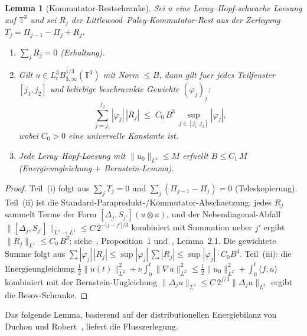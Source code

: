 \documentclass[12pt,a4paper]{article}
\theoremstyle{definition}
\theoremstyle{plain}
\newtheorem{lemma}[definition]{Lemma}
\theoremstyle{remark}
\begin{document}
\begin{lemma}[Kommutator-Restschranke]\label{lem:remainder}
Sei $u$ eine Leray--Hopf-schwache Loesung auf $\mathbb{T}^3$ und sei $R_j$
der Littlewood--Paley-Kommutator-Rest aus der Zerlegung
$T_j = \Pi_{j-1} - \Pi_j + R_j$.
\begin{enumerate}
  \item[\textup{(i)}] $\sum_j R_j = 0$ (Erhaltung).
  \item[\textup{(ii)}] Gilt $u \in L^3_t B^{1/3}_{3,\infty}(\mathbb{T}^3)$
    mit Norm $\le B$, dann gilt fuer jedes Teilfenster $[j_1, j_2]$ und
    beliebige beschraenkte Gewichte $(\varphi_j)_j$:
    \begin{equation}\label{eq:Rj-bound}
      \sum_{j=j_1}^{j_2} |\varphi_j|\,|R_j|
      \;\le\;
      C_0\,B^3\,\sup_{j \in [j_1,j_2]} |\varphi_j|,
    \end{equation}
    wobei $C_0 > 0$ eine universelle Konstante ist.
  \item[\textup{(iii)}] Jede Leray--Hopf-Loesung mit
    $\|u_0\|_{L^2} \le M$ erfuellt $B \le C_1\,M$ (Energieungleichung
    $+$ Bernstein-Lemma).
\end{enumerate}
\end{lemma}

\begin{proof}
Teil~(i) folgt aus $\sum_j T_j = 0$ und $\sum_j(\Pi_{j-1}-\Pi_j)=0$
(Teleskopierung). Teil~(ii) ist die Standard-Paraprodukt-/Kommutator-Abschaetzung:
jedes $R_j$ sammelt Terme der Form $[\Delta_j, S_{j'}](u \otimes u)$,
und der Nebendiagonal-Abfall $\|[\Delta_j, S_{j'}]\|_{L^1 \to L^1}
\le C\,2^{-|j-j'|/3}$ kombiniert mit Summation ueber $j'$ ergibt
$\|R_j\|_{L^1} \le C_0\,B^3$; siehe~\cite{CET94}, Proposition~1
und~\cite{DR00}, Lemma~2.1. Die gewichtete Summe folgt aus
$\sum |{\varphi_j}|\,|{R_j}| \le \sup|\varphi_j|\,\sum|R_j|
\le \sup|\varphi_j|\cdot C_0 B^3$.
Teil~(iii): die Energieungleichung $\frac{1}{2}\|u(t)\|_{L^2}^2
+ \nu\int_0^t \|\nabla u\|_{L^2}^2 \le \frac{1}{2}\|u_0\|_{L^2}^2
+ \int_0^t \langle f,u\rangle$ kombiniert mit der Bernstein-Ungleichung
$\|\Delta_j u\|_{L^3} \le C\,2^{j/3}\|\Delta_j u\|_{L^2}$ ergibt die
Besov-Schranke.
\end{proof}

Das folgende Lemma, basierend auf der distributionellen Energiebilanz von
Duchon und Robert~\cite{DR00}, liefert die Flusszerlegung.
\end{document}
